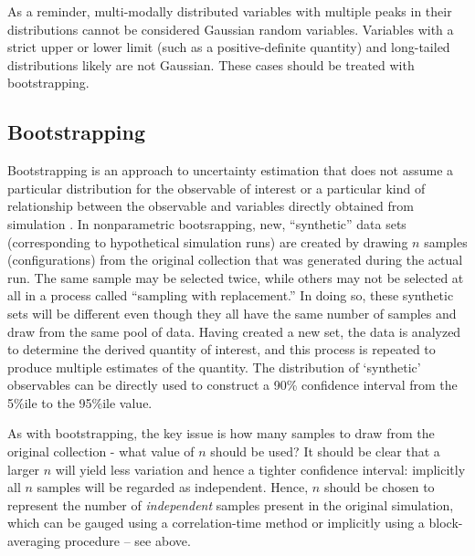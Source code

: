As a reminder, multi-modally distributed variables with multiple peaks in their distributions cannot be considered Gaussian random variables.  Variables with a strict upper or lower limit (such as a positive-definite quantity) and long-tailed distributions likely are not Gaussian.  These cases should be treated with bootstrapping.

\subsection{Bootstrapping}

Bootstrapping is an approach to uncertainty estimation that does not assume a particular distribution for the observable of interest or a particular kind of relationship between the observable and variables directly obtained from simulation \cite{Tibshirani1998}.  In nonparametric bootsrapping, new, ``synthetic'' data sets (corresponding to hypothetical simulation runs) are created by drawing $n$ samples (configurations) from the original collection that was generated during the actual run.  The same sample may be selected twice, while others may not be selected at all in a process called ``sampling with replacement.''  In doing so, these synthetic sets will be different even though they all have the same number of samples and draw from the same pool of data.  Having created a new set, the data is analyzed to determine the derived quantity of interest, and this process is repeated to produce multiple estimates of the quantity.  The distribution of `synthetic' observables can be directly used to construct a 90\% confidence interval from the 5\%ile to the 95\%ile value.

As with bootstrapping, the key issue is how many samples to draw from the original collection - what value of $n$ should be used?  It should be clear that a larger $n$ will yield less variation and hence a tighter confidence interval: implicitly all $n$ samples will be regarded as independent.  Hence, $n$ should be chosen to represent the number of \emph{independent} samples present in the original simulation, which can be gauged using a correlation-time method \cite{Chodera-2016,Lyman2007a} or implicitly using a block-averaging procedure -- see above.

